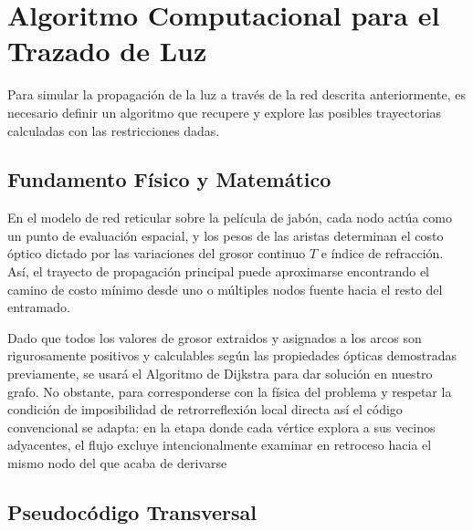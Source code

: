 \section{Algoritmo Computacional para el Trazado de Luz}

Para simular la propagación de la luz a través de la red descrita anteriormente, es necesario definir un algoritmo que recupere y explore las posibles trayectorias calculadas con las restricciones dadas. 

\subsection{Fundamento Físico y Matemático}
En el modelo de red reticular sobre la película de jabón, cada nodo actúa como un punto de evaluación espacial, y los pesos de las aristas determinan el costo óptico dictado por las variaciones del grosor continuo $T$ e índice de refracción. Así, el trayecto de propagación principal puede aproximarse encontrando el camino de costo mínimo desde uno o múltiples nodos fuente hacia el resto del entramado.

Dado que todos los valores de grosor extraidos y asignados a los arcos son rigurosamente positivos y calculables según las propiedades ópticas demostradas previamente, se usará el Algoritmo de Dijkstra para dar solución en nuestro grafo. No obstante, para corresponderse con la física del problema y respetar la condición de imposibilidad de retrorreflexión local directa así el código convencional se adapta: en la etapa donde cada vértice explora a sus vecinos adyacentes, el flujo excluye intencionalmente examinar en retroceso hacia el mismo nodo del que acaba de derivarse

\subsection{Pseudocódigo Transversal}


